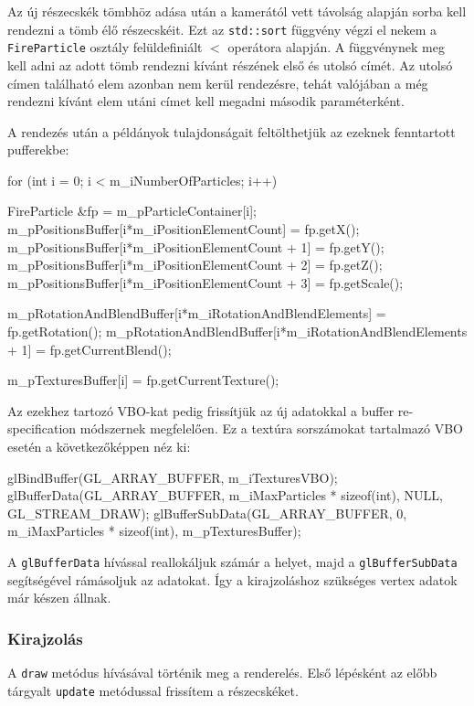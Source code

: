 Az új részecskék tömbhöz adása után a kamerától vett távolság alapján sorba kell rendezni a tömb élő részecskéit. Ezt az \texttt{std::sort} függvény végzi el nekem a \texttt{FireParticle} osztály felüldefiniált $<$ operátora alapján. A függvénynek meg kell adni az adott tömb rendezni kívánt részének első és utolsó címét. Az utolsó címen található elem azonban nem kerül rendezésre, tehát valójában a még rendezni kívánt elem utáni címet kell megadni második paraméterként.

A rendezés után a példányok tulajdonságait feltölthetjük az ezeknek fenntartott pufferekbe:
\begin{cpp}
for (int i = 0; i < m_iNumberOfParticles; i++)
{
	FireParticle &fp = m_pParticleContainer[i];
	m_pPositionsBuffer[i*m_iPositionElementCount] = fp.getX();
	m_pPositionsBuffer[i*m_iPositionElementCount + 1] = fp.getY();
	m_pPositionsBuffer[i*m_iPositionElementCount + 2] = fp.getZ();
	m_pPositionsBuffer[i*m_iPositionElementCount + 3] = fp.getScale();

	m_pRotationAndBlendBuffer[i*m_iRotationAndBlendElements] = 
						fp.getRotation();
	m_pRotationAndBlendBuffer[i*m_iRotationAndBlendElements + 1] = 
						fp.getCurrentBlend();

	m_pTexturesBuffer[i] = fp.getCurrentTexture();
}
\end{cpp}
Az ezekhez tartozó VBO-kat pedig frissítjük az új adatokkal a buffer re-specification módszernek megfelelően. Ez a textúra sorszámokat tartalmazó VBO esetén a következőképpen néz ki:
\begin{cpp}
glBindBuffer(GL_ARRAY_BUFFER, m_iTexturesVBO);
glBufferData(GL_ARRAY_BUFFER, m_iMaxParticles * sizeof(int), 
			NULL, GL_STREAM_DRAW);
glBufferSubData(GL_ARRAY_BUFFER, 0, m_iMaxParticles * sizeof(int), 
			m_pTexturesBuffer);
\end{cpp}
A \texttt{glBufferData} hívással reallokáljuk számár a helyet, majd a \texttt{glBufferSubData} segítségével rámásoljuk az adatokat. Így a kirajzoláshoz szükséges vertex adatok már készen állnak.

\subsubsection{Kirajzolás}
A \texttt{draw} metódus hívásával történik meg a renderelés. Első lépésként az előbb tárgyalt \texttt{update} metódussal frissítem a részecskéket. 

